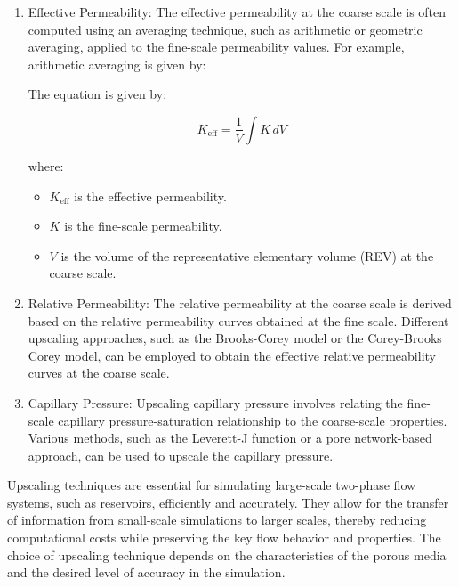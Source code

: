 		\begin{enumerate}
		
			\item Effective Permeability: The effective permeability at the coarse scale is often computed using an averaging technique, such as arithmetic or geometric averaging, applied to the fine-scale permeability values. For example, arithmetic averaging is given by:
			
			The equation is given by:

			\[ K_{\text{eff}} = \frac{1}{V} \int K \, dV \]

			where:
			\begin{itemize}
				\item   \( K_{\text{eff}} \) is the effective permeability.
				
				\item \( K \) is the fine-scale permeability.
				
				\item  \( V \) is the volume of the representative elementary volume (REV) at the coarse scale.
				
			\end{itemize}


			\item Relative Permeability: The relative permeability at the coarse scale is derived based on the relative permeability curves obtained at the fine scale. Different upscaling approaches, such as the Brooks-Corey model or the Corey-Brooks Corey model, can be employed to obtain the effective relative permeability curves at the coarse scale.

			\item Capillary Pressure: Upscaling capillary pressure involves relating the fine-scale capillary pressure-saturation relationship to the coarse-scale properties. Various methods, such as the Leverett-J function or a pore network-based approach, can be used to upscale the capillary pressure.
		
		\end{enumerate}

		Upscaling techniques are essential for simulating large-scale two-phase flow systems, such as reservoirs, efficiently and accurately. They allow for the transfer of information from small-scale simulations to larger scales, thereby reducing computational costs while preserving the key flow behavior and properties. The choice of upscaling technique depends on the characteristics of the porous media and the desired level of accuracy in the simulation\cite{pope2000turbulent}.
	
